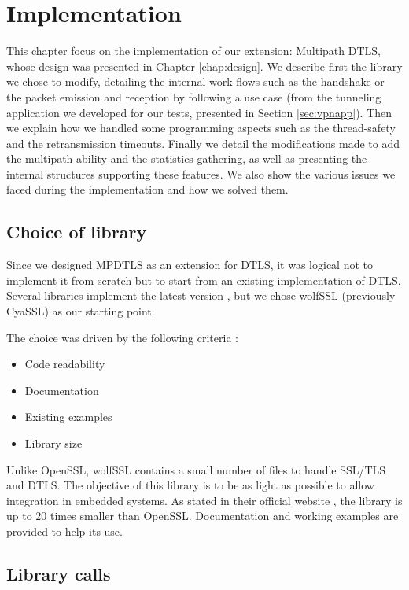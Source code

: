 \chapter{Implementation}\label{chap:implementation}

This chapter focus on the implementation of our extension: Multipath DTLS\cite{wolfssl-mpdtls}, whose design was presented in Chapter \ref{chap:design}. We describe first the library we chose to modify, detailing the internal work-flows such as the handshake or the packet emission and reception by following a use case (from the tunneling application we developed for our tests, presented in Section \ref{sec:vpnapp}). Then we explain how we handled some programming aspects such as the thread-safety and the retransmission timeouts. Finally we detail the modifications made to add the multipath ability and the statistics gathering, as well as presenting the internal structures supporting these features. We also show the various issues we faced during the implementation and how we solved them.

\section{Choice of library}

Since we designed MPDTLS as an extension for DTLS, it was logical not to implement it from scratch but to start from an existing implementation of DTLS. Several libraries implement the latest version \cite{wiki:dtls-implem}, but we chose wolfSSL \cite{wolfssl.git} (previously CyaSSL) as our starting point.

The choice was driven by the following criteria :
\begin{itemize}
\item Code readability
\item Documentation
\item Existing examples
\item Library size
\end{itemize}

Unlike OpenSSL, wolfSSL contains a small number of files to handle SSL/TLS and DTLS. The objective of this library is to be as light as possible to allow integration in embedded systems. As stated in their official website \cite{wolfssl}, the library is up to 20 times smaller than OpenSSL. Documentation and working examples are provided to help its use.

\section{Library calls}

